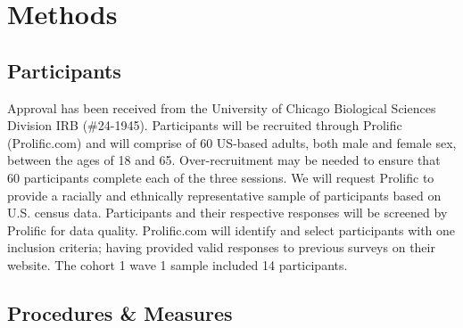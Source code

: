 \documentclass[
  man,
  longtable,
  nolmodern,
  notxfonts,
  notimes,
  colorlinks=true,linkcolor=blue,citecolor=blue,urlcolor=blue]{apa7}
\begin{document}
\section{Methods}\label{methods}

\subsection{Participants}\label{participants}

Approval has been received from the University of Chicago Biological
Sciences Division IRB (\#24-1945). Participants will be recruited
through Prolific (Prolific.com) and will comprise of 60 US-based adults,
both male and female sex, between the ages of 18 and 65.
Over-recruitment may be needed to ensure that 60 participants complete
each of the three sessions. We will request Prolific to provide a
racially and ethnically representative sample of participants based on
U.S. census data. Participants and their respective responses will be
screened by Prolific for data quality. Prolific.com will identify and
select participants with one inclusion criteria; having provided valid
responses to previous surveys on their website. The cohort 1 wave 1
sample included 14 participants.

\subsection{Procedures \& Measures}\label{procedures-measures}
\end{document}
